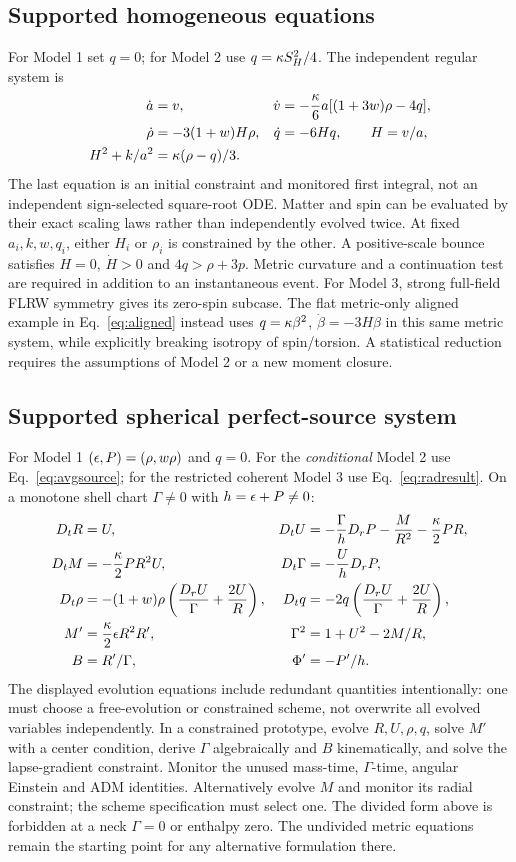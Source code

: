 \subsection{Supported homogeneous equations}
For Model 1 set $q=0$; for Model 2 use $q=\kappa S_H^2/4$. The independent regular system is
\begin{align}
 \dot a&=v,&\dot v&=-\frac{\kappa}6 a[(1+3w)\rho-4q],\\
 \dot\rho&=-3(1+w)H\rho,&\dot q&=-6Hq,\qquad H=v/a,\label{eq:homogeneous}\\
 H^2+k/a^2&=\kappa(\rho-q)/3.\label{eq:homconstraint}
\end{align}
The last equation is an initial constraint and monitored first integral, not an independent sign-selected square-root ODE. Matter and spin can be evaluated by their exact scaling laws rather than independently evolved twice. At fixed $a_i,k,w,q_i$, either $H_i$ or $\rho_i$ is constrained by the other. A positive-scale bounce satisfies $H=0$, $\dot H>0$ and $4q>\rho+3p$. Metric curvature and a continuation test are required in addition to an instantaneous event. For Model 3, strong full-field FLRW symmetry gives its zero-spin subcase. The flat metric-only aligned example in Eq.~\eqref{eq:aligned} instead uses $q=\kappa\beta^2$, $\dot\beta=-3H\beta$ in this same metric system, while explicitly breaking isotropy of spin/torsion. A statistical reduction requires the assumptions of Model 2 or a new moment closure.

\subsection{Supported spherical perfect-source system}
For Model 1 $(\epsilon,P)=(\rho,w\rho)$ and $q=0$. For the \emph{conditional} Model 2 use Eq.~\eqref{eq:avgsource}; for the restricted coherent Model 3 use Eq.~\eqref{eq:radresult}. On a monotone shell chart $\Gamma\ne0$ with $h=\epsilon+P\ne0$:
\begin{align}
 D_t R&=U,&D_t U&=-\frac{\Gamma}{h}D_r P-\frac{M}{R^2}-\frac{\kappa}2 PR,\\
 D_t M&=-\frac{\kappa}2 PR^2U,&D_t\Gamma&=-\frac U hD_r P,\label{eq:closed}\\
 D_t\rho&=-(1+w)\rho\left(\frac{D_r U}{\Gamma}+\frac{2U}{R}\right),&
 D_t q&=-2q\left(\frac{D_r U}{\Gamma}+\frac{2U}{R}\right),\\
 M'&=\frac{\kappa}2\epsilon R^2R',&\Gamma^2&=1+U^2-2M/R,\\
 B&=R'/\Gamma,&\Phi'&=-P'/h.
\end{align}
The displayed evolution equations include redundant quantities intentionally: one must choose a free-evolution or constrained scheme, not overwrite all evolved variables independently. In a constrained prototype, evolve $R,U,\rho,q$, solve $M'$ with a center condition, derive $\Gamma$ algebraically and $B$ kinematically, and solve the lapse-gradient constraint. Monitor the unused mass-time, $\Gamma$-time, angular Einstein and ADM identities. Alternatively evolve $M$ and monitor its radial constraint; the scheme specification must select one. The divided form above is forbidden at a neck $\Gamma=0$ or enthalpy zero. The undivided metric equations remain the starting point for any alternative formulation there.

